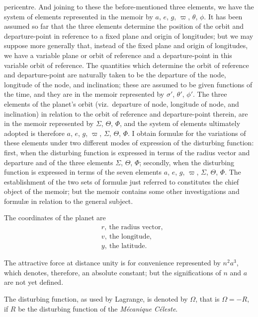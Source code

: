 \documentclass[11pt]{article}
\begin{document}
pericentre. And joining to these the before-mentioned three elements, we have the system of elements represented in the memoir by $a$, $e$, $g$, $\varpi$, $\theta$, $\phi$. It has been assumed so far that the three elements determine the position of the orbit and departure-point in reference to a fixed plane and origin of longitudes; but we may suppose more generally that, instead of the fixed plane and origin of longitudes, we have a variable plane or orbit of reference and a departure-point in this variable orbit of reference. The quantities which determine the orbit of reference and departure-point are naturally taken to be the departure of the node, longitude of the node, and inclination; these are assumed to be given functions of the time, and they are in the memoir represented by $\sigma'$, $\theta'$, $\phi'$. The three elements of the planet's orbit (viz.\ departure of node, longitude of node, and inclination) in relation to the orbit of reference and departure-point therein, are in the memoir represented by $\Sigma$, $\Theta$, $\Phi$, and the system of elements ultimately adopted is therefore $a$, $e$, $g$, $\varpi$, $\Sigma$, $\Theta$, $\Phi$. I obtain formul{\ae} for the variations of these elements under two different modes of expression of the disturbing function: first, when the disturbing function is expressed in terms of the radius vector and departure and of the three elements $\Sigma$, $\Theta$, $\Phi$; secondly, when the disturbing function is expressed in terms of the seven elements $a$, $e$, $g$, $\varpi$, $\Sigma$, $\Theta$, $\Phi$. The establishment of the two sets of formul{\ae} just referred to constitutes the chief object of the memoir; but the memoir contains some other investigations and formul{\ae} in relation to the general subject.

\medskip

The coordinates of the planet are
\begin{align*}
& r,\ \text{the radius vector,}\\
& v,\ \text{the longitude,}\\
& y,\ \text{the latitude.}
\end{align*}

The attractive force at distance unity is for convenience represented by $n^2 a^3$, which denotes, therefore, an absolute constant; but the significations of $n$ and $a$ are not yet defined.

The disturbing function, as used by Lagrange, is denoted by $\Omega$, that is $\Omega = -R$, if $R$ be the disturbing function of the \textit{M{\'e}canique C{\'e}leste}.
\end{document}
